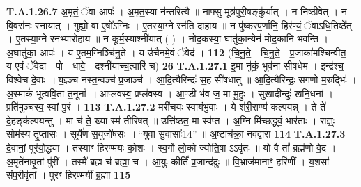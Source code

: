 \documentclass[17pt]{extarticle}
\begin{document}
                  \newline
                                                                  \textbf{ T.A.1.26.7} \newline
                  अ॒मृतं॒ ॅवा आपः॑ । अ॒मृत॒स्या-न॑न्तरित्यै ॥  नाफ्सु-मूत्र॑पुरी॒षङ्कु॑र्यात् । न निष्ठी॑वेत् । न वि॒वस॑नः स्नायात् । गुह्यो॒ वा ए॒षो᳚ऽग्निः ।  ए॒तस्या॒ग्ने रन॑ति दाहाय ॥ न पु॑ष्करप॒र्णानि॒ हिर॑ण्यं॒ ॅवाऽधि॒तिष्ठे᳚त् । ए॒तस्या॒ग्ने-रन॑भ्यारोहाय ॥ न कूर्म॒स्याश्नी॑यात् ( ) । नोद॒कस्या॒-घातु॑का॒न्येन॑-मोद॒कानि॑ भवन्ति । अ॒घातु॑का॒ आपः॑ । य ए॒तम॒ग्निञ्चि॑नु॒ते । य उ॑चैनमे॒वं ॅवेद॑ । \textbf{ 112} \newline
                  \newline
                                                        (चि॒नु॒ते॒ - चि॒नु॒ते॒ - प्र॒जाका॑मश्चिन्वीत॒ - य ए॒वं ॅवेदा - पो॑ - धावे॒ - दश्नी॑याच्च॒त्वारि॑ च) \textbf{26} \newline \newline
                                \textbf{ T.A.1.27.1} \newline
                  इ॒मा नु॑कं॒ भुव॑ना सीषधेम । इन्द्र॑श्च॒ विश्वे॑च दे॒वाः ॥ य॒ज्ञ्ञ्च॑ नस्त॒न्वञ्च॑ प्र॒जाञ्च॑ । आ॒दि॒त्यैरिन्दः॑ स॒ह सी॑षधातु ॥  आ॒दि॒त्यैरिन्द्रः॒ सग॑णो-म॒रुद्भिः॑ । अ॒स्माकं॑ भूत्ववि॒ता त॒नूनां᳚ ॥ आप्ल॑वस्व॒ प्रप्ल॑वस्व । आ॒ण्डी भ॑व ज॒ मा मु॒हुः । सुखादीन्दुः॑ खनि॒धनां । प्रति॑मुञ्चस्व॒ स्वां पु॒रं । \textbf{ 113} \newline
                  \newline
                                                                  \textbf{ T.A.1.27.2} \newline
                  मरी॑चयः स्वायंभु॒वाः । ये श॑री॒राण्य॑ कल्पयन्न् ।  ते ते॑ दे॒हङ्क॑ल्पयन्तु । मा च॑ ते॒ ख्या स्म॑ तीरिषत् ॥ उत्ति॑ष्ठत॒ मा स्व॑प्त । अ॒ग्नि-मि॑च्छद्ध्वं॒ भार॑ताः । राज्ञ्ः॒ सोम॑स्य तृ॒प्तासः॑ । सूर्ये॑ण स॒युजो॑षसः ॥ “युवा॑ सु॒वासाः᳚{14}” ॥  अ॒ष्टाच॑क्रा॒ नव॑द्वारा \textbf{ 114} \newline
                  \newline
                                                                  \textbf{ T.A.1.27.3} \newline
                  दे॒वानां॒ पूर॑यो॒द्ध्या । तस्याꣳ॑ हिरण्म॑यः को॒शः । स्व॒र्गो लो॒को ज्योति॒षा ऽऽवृ॑तः ॥ यो वै तां᳚ ब्रह्म॑णो वे॒द । अ॒मृते॑नावृ॒तां पु॑रीं । तस्मै᳚ ब्रह्म च॑ ब्रह्मा॒ च । आ॒युः कीर्तिं॑ प्र॒जान्द॑दुः ॥ वि॒भ्राज॑मानाꣳ॒॒ हरि॑णीं । य॒शसा॑ संप॒रीवृ॑तां । पुरꣳ॑ हिरण्म॑यीं ब्र॒ह्मा \textbf{ 115} \newline
                  \newline
\end{document}
